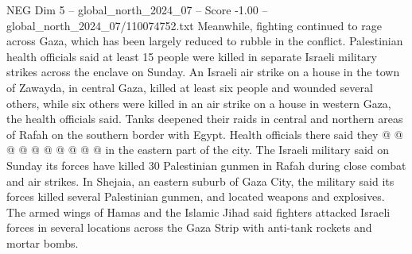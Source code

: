 \begin{textsample}{NEG Dim 5 – global\_north\_2024\_07 – Score -1.00 – global\_north\_2024\_07/110074752.txt}
Meanwhile, fighting continued to rage across Gaza, which has been largely reduced to rubble in the conflict.
Palestinian health officials said at least 15 people were killed in separate Israeli military strikes across the enclave on Sunday.
An Israeli air strike on a house in the town of Zawayda, in central Gaza, killed at least six people and wounded several others, while six others were killed in an air strike on a house in western Gaza, the health officials said.
Tanks deepened their raids in central and northern areas of Rafah on the southern border with Egypt.
Health officials there said they @ @ @ @ @ @ @ @ @ @ in the eastern part of the city.
The Israeli military said on Sunday its forces have killed 30 Palestinian gunmen in Rafah during close combat and air strikes.
In Shejaia, an eastern suburb of Gaza City, the military said its forces killed several Palestinian gunmen, and located weapons and explosives.
The armed wings of Hamas and the Islamic Jihad said fighters attacked Israeli forces in several locations across the Gaza Strip with anti-tank rockets and mortar bombs.

\end{textsample}
